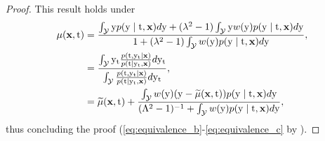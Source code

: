 \begin{lemma}
\begin{proof}
        This result holds under
        \begin{subequations}
            \begin{align}
                \mu(\x, \tf) 
                &= \frac{\int_{\Ycal} \y p(\y \mid \tf, \x)d\y + (\lambda^2 - 1)\int_{\Ycal} \y w(\y)p(\y \mid \tf, \x)d\y}{1 + (\lambda^2 - 1)\int_{\Ycal} w(\y)p(\y \mid \tf, \x)d\y},\\
                &= \frac{\int_{\Ycal} \yt \frac{p(\tf, \yt \mid \x)}{p(\tf \mid \yt, \x)}d\yt}{\int_{\Ycal} \frac{p(\tf, \yt \mid \x)}{p(\tf \mid \yt, \x)}d\yt}, \label{eq:equivalence_b}\\
                &= \mut(\x, \tf) + \frac{\int_\Ycal w(\y) (\y - \mut(\x, \tf)) p(\y \mid \tf, \x)d\y}{(\Lambda^2 - 1)^{-1} + \int_\Ycal w(\y)p(\y \mid \tf, \x)d\y} \label{eq:equivalence_c},
            \end{align}
        \end{subequations}
        thus concluding the proof (\cref{eq:equivalence_b}-\cref{eq:equivalence_c} by ).
    \end{proof}
\end{lemma}